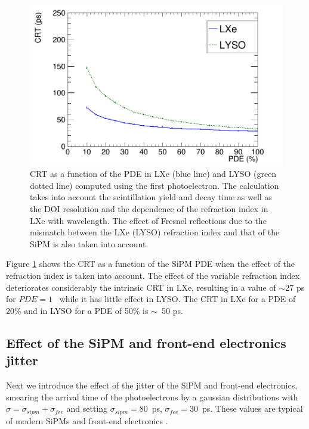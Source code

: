 \documentclass[review]{elsarticle}
\begin{document}
\begin{figure}[!bhtp]
	\centering
	\includegraphics[scale=0.30]{../img/PetaloTOF/CRTvsPDE_phys_LXeLYSONoJitterFstPE.png}
	\caption{\label{fig.crt2} CRT as a function of the PDE in LXe (blue line) and LYSO (green dotted line) computed using the first photoelectron. The calculation takes into account the scintillation yield and decay time as well as the DOI resolution and the dependence of the refraction index in LXe with wavelength. The effect of Fresnel reflections
	due to the mismatch between the LXe (LYSO) refraction index and that of the SiPM is also taken into
	account.  }
\end{figure}

Figure \ref{fig.crt2} shows the CRT as a function of the
 SiPM PDE when the effect of the refraction index is taken into account. 
 The effect of the variable refraction index deteriorates considerably the intrinsic CRT in LXe, resulting in a value of $\sim$27 ps for $PDE=1$~ while it has little effect in LYSO. The CRT in LXe for a PDE of 20\% and in LYSO for a PDE of
 50\% is $\sim$~50 ps.
  
\subsection*{Effect of the SiPM  and front-end electronics jitter}
  Next we introduce the effect of the jitter of the SiPM and front-end electronics, smearing the arrival time of the photoelectrons by a gaussian distributions with $\sigma = \sigma_{sipm} +  \sigma_{fee}$ and setting 
 $\sigma_{sipm} = 80$~ps, $\sigma_{fee} = 30$~ps. These values are typical of modern SiPMs and front-end electronics \cite{FundamentalLimits}. 
 
\end{document}
